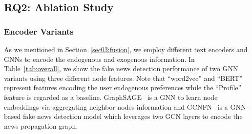 \documentclass[sigconf]{acmart}
\begin{document}
\begin{table}[h]
\centering
\caption{Fake news detection performance on two datasets with different node feature types and models. The bold (underlined) text indicates the best (second best) performances on each dataset.}
\label{tab:overall}
\end{table} 




\subsection{RQ2: Ablation Study}



\subsubsection{Encoder Variants}
As we mentioned in Section~\ref{sec03:fusion}, we employ different text encoders and GNNs to encode the endogenous and exogenous information.
In Table~\ref{tab:overall}, we show the fake news detection performance of two GNN variants using three different node features.
Note that ``word2vec'' and ``BERT'' represent features encoding the user endogenous preferences while the ``Profile'' feature is regarded as a baseline.
GraphSAGE~\cite{hamilton2017inductive} is a GNN to learn node embeddings via aggregating neighbor nodes information and
GCNFN~\cite{monti2019fake} is a GNN-based fake news detection model which leverages two GCN layers to encode the news propagation graph.
\end{document}
